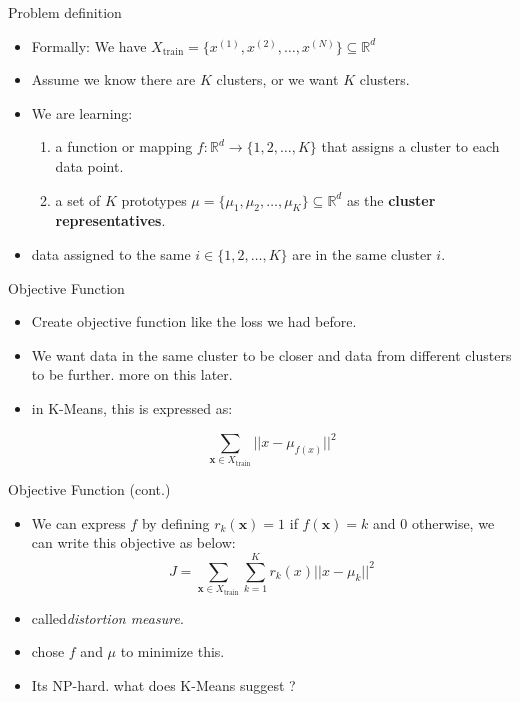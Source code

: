\documentclass[serif, aspectratio=169]{beamer}
\begin{document}
\begin{frame}{Problem definition}
    \begin{itemize}
        \item Formally: We have $X_{\text{train}} = \{ x^{(1)}, x^{(2)}, \dots, x^{(N)} \} \subseteq \mathbb{R}^d$
        \item Assume we know there are $K$ clusters, or we want $K$ clusters.
        \item We are learning:
        \begin{enumerate}
            \item a function or mapping $f:\mathbb{R}^d\to \{1,2, \dots , K\}$ that assigns a cluster to each data point.
            \item a set of \( K \) prototypes \(\mu = \{ \mu_1, \mu_2, \dots, \mu_K  \} \subseteq \mathbb{R}^d \) as the \textbf{cluster representatives}.
        \end{enumerate}
        \item data assigned to the same $i \in \{1,2, \dots , K\}$ are in the same cluster $i$.
    \end{itemize}
\end{frame}

\begin{frame}{Objective Function}
\begin{itemize}
    
    \item Create objective function like the loss we had before.
    \item We want data in the same cluster to be closer and data from different clusters to be further. more on this later.
    \item in K-Means, this is expressed as:

    $$
    \sum_{\mathbf{x} \in X_{\text{train}}} || x -  \mu_{f(x)} ||^2
    $$
    
\end{itemize}
\end{frame}


\begin{frame}{Objective Function (cont.)}
    \begin{itemize}
        

        \item We can express $f$ by defining $r_k(\mathbf{x}) = 1$ if $f(\mathbf{x}) = k$ and $0$ otherwise, we can write this objective as below:
$$
J = \sum_{\mathbf{x} \in X_{\text{train}}} \sum_{k=1}^{K} r_k(x)|| x -  \mu_k ||^2
$$
        \item called\textit{distortion measure}.
        \item chose $f$ and $\mu$ to minimize this.
        \item Its NP-hard. what does K-Means suggest ?
      
    \end{itemize}
\end{frame}
\end{document}
